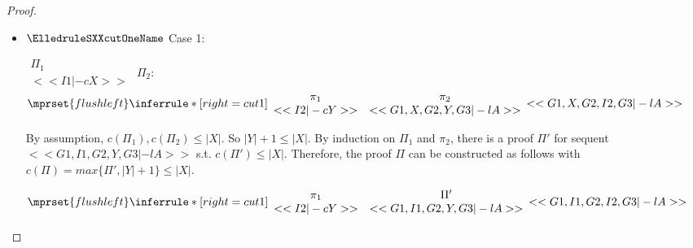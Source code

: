 \begin{proof}
\begin{enumerate}
\begin{itemize}
    \item $\ElledruleSXXcutOneName$ Case 1:
      \begin{center}
        \scriptsize
        \begin{math}
          \begin{array}{c}
            \Pi_1 \\
            {<<I1 |-c X>>}
          \end{array}
        \end{math}
        \qquad\qquad
        $\Pi_2$:
        \begin{math}
          $$\mprset{flushleft}
          \inferrule* [right={\tiny cut1}] {
            {
              \begin{array}{cc}
                \pi_1 & \pi_2 \\
                {<<I2 |-c Y>>} & {<<G1, X, G2, Y, G3 |-l A>>}
              \end{array}
            }
          }{<<G1, X, G2, I2, G3 |-l A>>}
        \end{math}
      \end{center}
      By assumption, $c(\Pi_1),c(\Pi_2)\leq |X|$. So $|Y|+1 \leq |X|$. By induction on $\Pi_1$
      and $\pi_2$, there is a proof $\Pi'$ for sequent $<<G1, I1, G2, Y, G3 |-l A>>$ s.t.
      $c(\Pi') \leq |X|$. Therefore, the proof $\Pi$ can be constructed as follows with
      $c(\Pi) = max\{\Pi', |Y|+1\} \leq |X|$.
      \begin{center}
        \scriptsize
        \begin{math}
          $$\mprset{flushleft}
          \inferrule* [right={\tiny cut1}] {
            {
              \begin{array}{cc}
                \pi_1 & \Pi' \\
                {<<I2 |-c Y>>} & {<<G1, I1, G2, Y, G3 |-l A>>}
              \end{array}
            }
          }{<<G1, I1, G2, I2, G3 |-l A>>}
        \end{math}
      \end{center}


\end{itemize}
\end{enumerate}
\end{proof}
